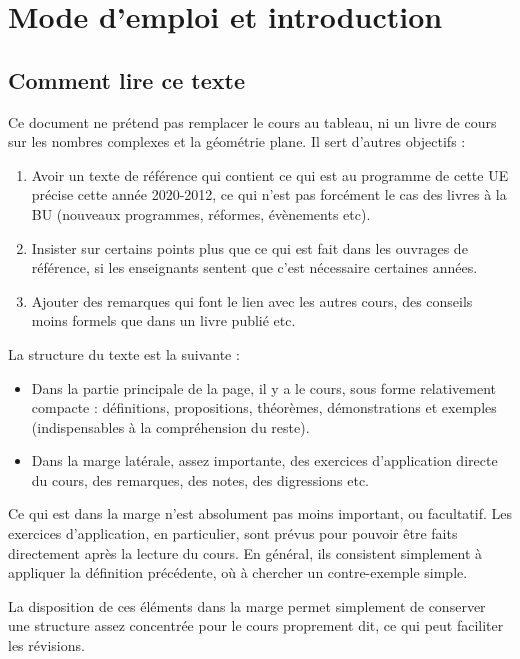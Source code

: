 \documentclass[11pt,a4paper,oneside]{book}
\theoremstyle{definition}
\theoremstyle{plain}
\begin{document}
\tableofcontents
\restoregeometry

\section{Mode d'emploi et introduction}

\subsection{Comment lire ce texte}

Ce document ne prétend pas remplacer le cours au tableau, ni un livre de cours sur les nombres complexes et la géométrie plane. Il sert d'autres objectifs :



\begin{enumerate}
\item Avoir un texte de référence qui contient ce qui est au programme de cette UE précise cette année 2020-2012, ce qui n'est pas forcément le cas des livres à la BU (nouveaux programmes, réformes, évènements etc).
\item Insister sur certains points plus que ce qui est fait dans les ouvrages de référence, si les enseignants sentent que c'est nécessaire certaines années. 
\item Ajouter des remarques qui font le lien avec les autres cours, des conseils moins formels que dans un livre publié etc.
\end{enumerate}

La structure du texte est la suivante : 
\begin{itemize}
\item Dans la partie principale de la page, il y a le cours, sous forme relativement compacte : définitions, propositions, théorèmes, démonstrations et exemples (indispensables à la compréhension du reste).
\item Dans la marge latérale, assez importante, des exercices d'application directe du cours, des remarques, des notes, des digressions etc.
\end{itemize}

\begin{mdframed}
Ce qui est dans la marge n'est absolument pas \og moins important\fg, ou facultatif. Les exercices d'application, en particulier, sont prévus pour pouvoir être faits directement après la lecture du cours. En général, ils consistent simplement à appliquer la définition précédente, où à chercher un contre-exemple simple.

La disposition de ces éléments dans la marge permet simplement de conserver une structure assez concentrée pour le cours proprement dit, ce qui peut faciliter les révisions.
\end{mdframed}
\end{document}
